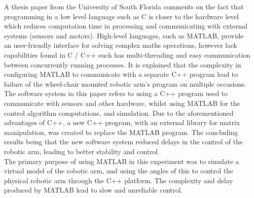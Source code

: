\documentclass[12pt,openany,a4paper]{book}
\begin{document}
A thesis paper from the University of South Florida comments on the fact that programming in a low level language such as C is closer to the hardware level which reduces computation time in processing and communicating with external systems (sensors and motors). High-level languages, such as MATLAB, provide an user-friendly interface for solving complex maths operations, however lack capabilities found in C / C++ such has multi-threading and easy communication between concurrently running processes. It is explained that the complexity in configuring MATLAB to communicate with a separate C++ program lead to failure of the wheel-chair mounted robotic arm's program on multiple occasions. The software system in this paper refers to using a C++ program used to communicate with sensors and other hardware, whilst using MATLAB for the control algorithm computations, and simulation. Due to the aforementioned advantages of C++, a new C++ program, with an external library for matrix manipulation, was created to replace the MATLAB program. The concluding results being that the new software system reduced delays in the control of the robotic arm, leading to better stability and control.\\
The primary purpose of using MATLAB in this experiment was to simulate a virtual model of the robotic arm, and using the angles of this to control the physical robotic arm through the C++ platform. The complexity and delay produced by MATLAB lead to slow and unreliable control.\\
\end{document}
